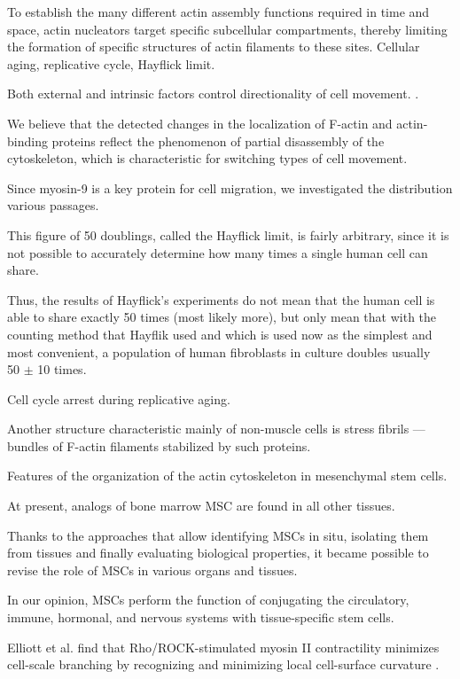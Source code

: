 \documentclass[english,authoryear]{elsarticle}
\begin{document}
To establish the many different actin assembly functions required in time and space, actin nucleators target specific subcellular compartments, thereby limiting the formation of specific structures of actin filaments to these sites.
Cellular aging, replicative cycle, Hayflick limit.

Both external and intrinsic factors control directionality of cell movement. \cite{tiurin2013molecular}.

We believe that the detected changes in the localization of F-actin and actin-binding proteins reflect the phenomenon of partial disassembly of the cytoskeleton, which is characteristic for switching types of cell movement.

Since myosin-9 is a key protein for cell migration, we investigated the distribution various passages.


This figure of 50 doublings, called the Hayflick limit, is fairly arbitrary, since it is not possible to accurately determine how many times a single human cell can share.

Thus, the results of Hayflick's experiments do not mean that the human cell is able to share exactly 50 times (most likely more), but only mean that with the counting method that Hayflik used and which is used now as the simplest and most convenient, a population of human fibroblasts in culture doubles usually ~ 50 $\pm$ 10 times.

Cell cycle arrest during replicative aging.

Another structure characteristic mainly of non-muscle cells is stress fibrils — bundles of F-actin filaments stabilized by such proteins.

Features of the organization of the actin cytoskeleton in mesenchymal stem cells.

At present, analogs of bone marrow MSC are found in all other tissues.

Thanks to the approaches that allow identifying MSCs in situ, isolating them from tissues and finally evaluating biological properties, it became possible to revise the role of MSCs in various organs and tissues.

In our opinion, MSCs perform the function of conjugating the circulatory, immune, hormonal, and nervous systems with tissue-specific stem cells.


Elliott et al. find that Rho/ROCK-stimulated myosin II contractility minimizes cell-scale branching by recognizing and minimizing local cell-surface curvature \cite{elliott2015myosin}.
\end{document}
